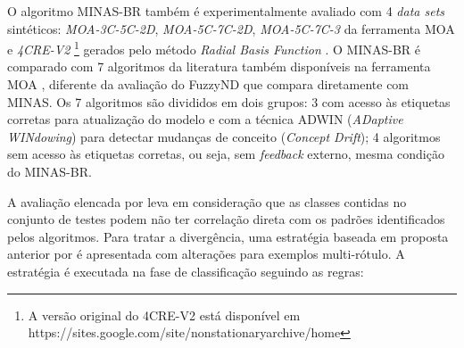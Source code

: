 
O algoritmo MINAS-BR também é experimentalmente avaliado com 4 \emph{data sets}
sintéticos: \emph{MOA-3C-5C-2D}, \emph{MOA-5C-7C-2D}, \emph{MOA-5C-7C-3} da
ferramenta MOA \cite{MOA} e \emph{4CRE-V2}
\footnote{
    A versão original do \dataset 4CRE-V2 está disponível em 
    https://sites.google.com/site/nonstationaryarchive/home
}
gerados pelo método \emph{Radial Basis Function} \cite{souza2015}.
O MINAS-BR é comparado com 7 algoritmos da literatura também disponíveis na ferramenta
MOA \cite{MOA},
diferente da avaliação do FuzzyND que compara diretamente com MINAS.
Os 7 algoritmos são divididos em dois grupos: 3 com acesso às etiquetas corretas para
atualização do modelo e com a técnica ADWIN (\emph{ADaptive WINdowing}) para detectar
mudanças de conceito (\emph{Concept Drift}); 4 algoritmos sem acesso às etiquetas corretas,
ou seja, sem \emph{feedback} externo, mesma condição do MINAS-BR.


A avaliação elencada por  leva em consideração que as classes
contidas no conjunto de testes podem não ter correlação direta com os padrões identificados
pelos algoritmos.
Para tratar a divergência, uma estratégia baseada em proposta anterior por
 é apresentada com alterações para exemplos multi-rótulo.
A estratégia é executada na fase de classificação seguindo as regras:

